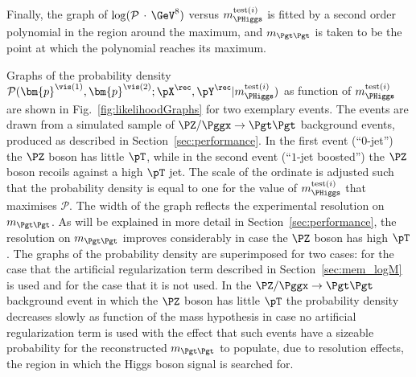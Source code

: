 Finally, the graph of $\log(\mathcal{P} \, \cdot \, \mbox{\GeV}^{8})$ 
versus $m_{\PHiggs}^{\textrm{test}(i)}$ is fitted by a second order polynomial
in the region around the maximum,
and $m_{\Pgt\Pgt}$ is taken to be the point at which the polynomial reaches its maximum.

Graphs of the probability density $\mathcal{P}(\bm{p}^{\vis(1)},\bm{p}^{\vis(2)};\pX^{\rec},\pY^{\rec}|m_{\PHiggs}^{\textrm{test}(i)})$ 
as function of $m_{\PHiggs}^{\textrm{test}(i)}$ are shown in Fig.~\ref{fig:likelihoodGraphs} for two exemplary events.
The events are drawn from a simulated sample of $\PZ/\Pggx \to \Pgt\Pgt$ background events, produced as described in Section~\ref{sec:performance}.
In the first event (``$0$-jet'') the $\PZ$ boson has little $\pT$, while in the second event (``$1$-jet boosted'') the $\PZ$ boson recoils against a high $\pT$ jet.
The scale of the ordinate is adjusted such that the probability density is equal to one
for the value of $m_{\PHiggs}^{\textrm{test}(i)}$ that maximises $\mathcal{P}$.
The width of the graph reflects the experimental resolution on $m_{\Pgt\Pgt}$.
As will be explained in more detail in Section~\ref{sec:performance}, the resolution on $m_{\Pgt\Pgt}$ improves considerably in case the $\PZ$ boson has high $\pT$.
The graphs of the probability density are superimposed for two cases:
for the case that the artificial regularization term described in Section~\ref{sec:mem_logM} is used and for the case that it is not used.
In the $\PZ/\Pggx \to \Pgt\Pgt$ background event in which the $\PZ$ boson has little $\pT$
the probability density decreases slowly as function of the mass hypothesis in case no artificial regularization term is used
with the effect that such events have a sizeable probability for the reconstructed $m_{\Pgt\Pgt}$ to populate, due to resolution effects, 
the region in which the Higgs boson signal is searched for.
